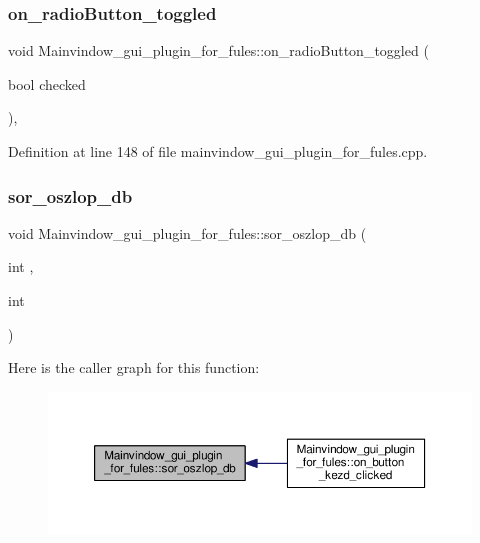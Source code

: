 \subsubsection{\texorpdfstring{on\+\_\+radio\+Button\+\_\+toggled}{on\_radioButton\_toggled}}
{\footnotesize\ttfamily void Mainvindow\+\_\+gui\+\_\+plugin\+\_\+for\+\_\+fules\+::on\+\_\+radio\+Button\+\_\+toggled (\begin{DoxyParamCaption}\item[{bool}]{checked }\end{DoxyParamCaption})\hspace{0.3cm}{\ttfamily [private]}, {\ttfamily [slot]}}



Definition at line 148 of file mainvindow\+\_\+gui\+\_\+plugin\+\_\+for\+\_\+fules.\+cpp.

\mbox{\label{classMainvindow__gui__plugin__for__fules_a04e1668bac22f62c014954222d19f2ac}} 
\subsubsection{\texorpdfstring{sor\+\_\+oszlop\+\_\+db}{sor\_oszlop\_db}}
{\footnotesize\ttfamily void Mainvindow\+\_\+gui\+\_\+plugin\+\_\+for\+\_\+fules\+::sor\+\_\+oszlop\+\_\+db (\begin{DoxyParamCaption}\item[{int}]{,  }\item[{int}]{ }\end{DoxyParamCaption})\hspace{0.3cm}{\ttfamily [signal]}}

Here is the caller graph for this function\+:\nopagebreak
\begin{figure}[H]
\begin{center}
\leavevmode
\includegraphics[width=350pt]{classMainvindow__gui__plugin__for__fules_a04e1668bac22f62c014954222d19f2ac_icgraph}
\end{center}
\end{figure}
\mbox{\label{classMainvindow__gui__plugin__for__fules_ab44bcc45064b346477fef5df26a119cc}} 
